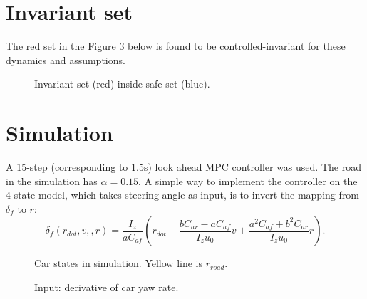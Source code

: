 \documentclass[letterpaper, 12pt]{article}
\newlength{\figurewidth}
\newlength{\figureheight}
\begin{document}
\section{Invariant set} %
\label{sec:invariant_set}

The red set in the Figure \ref{fig:invariant} below is found to be controlled-invariant for these dynamics and assumptions.

\setlength{} 
\setlength{} 

\begin{figure}[h]
	\begin{center}
		
	\end{center}
	\caption{Invariant set (red) inside safe set (blue).}
	\label{fig:invariant}
\end{figure}


\section{Simulation} %
\label{sec:simulation}

A 15-step (corresponding to 1.5s) look ahead MPC controller was used. The road in the simulation has $\alpha = 0.15$. A simple way to implement the controller on the 4-state model, which takes steering angle as input, is to invert the mapping from $\delta_f$ to $\dot r$:
\begin{equation}
	\delta_f(r_{dot}, v, ,r) = \frac{I_z}{a C_{af}} \left( r_{dot} - \frac{b C_{ar} - a C_{af}}{I_z u_0} v + \frac{a^2 C_{af} + b^2 C_{ar}}{I_z u_0} r \right) .
\end{equation}

\setlength{} 
\setlength{} 

\begin{figure}[h]
	\begin{center}
		
	\end{center}
	\caption{Car states in simulation. Yellow line is $r_{road}$.}
	\label{fig:invariant}
\end{figure}
\setlength{} 
\setlength{} 

\begin{figure}[h]
	\begin{center}
		
	\end{center}
	\caption{Input: derivative of car yaw rate.}
	\label{fig:invariant}
\end{figure}
\end{document}
